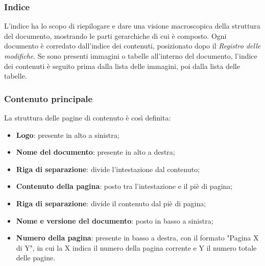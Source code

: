 \subsubsection{Indice}
L'indice ha lo scopo di riepilogare e dare una visione macroscopica della struttura del documento, mostrando le parti gerarchiche di cui è composto. Ogni documento è corredato dall'indice dei contenuti, posizionato dopo il \textit{Registro delle modifiche}. Se sono presenti immagini o tabelle all'interno del documento, l'indice dei contenuti è seguito prima dalla lista delle immagini, poi dalla lista delle tabelle.

\subsubsection{Contenuto principale}
La struttura delle pagine di contenuto è così definita: \begin{itemize}
\item \textbf{Logo}: presente in alto a sinistra;
\item \textbf{Nome del documento}: presente in alto a destra;
\item \textbf{Riga di separazione}: divide l'intestazione dal contenuto;
\item \textbf{Contenuto della pagina}: posto tra l'intestazione e il piè di pagina;
\item \textbf{Riga di separazione}: divide il contenuto dal piè di pagina;
\item \textbf{Nome e versione del documento}: posto in basso a sinistra;
\item \textbf{Numero della pagina}: presente in basso a destra, con il formato "Pagina X di Y", in cui la X indica il numero della pagina corrente e Y il numero totale delle pagine.
\end{itemize}

\label{par:verbali}
